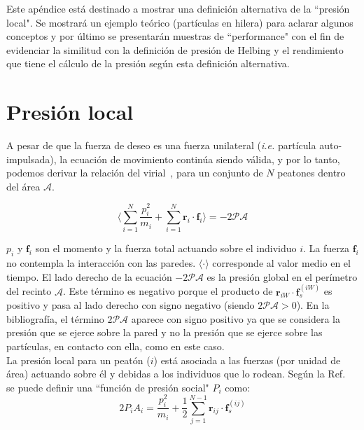 \label{appendix:presion}

Este apéndice está destinado a mostrar una definición alternativa de la ``presión local". Se mostrará un ejemplo teórico (partículas en hilera) para aclarar algunos conceptos y por último se presentarán muestras de ``performance" con el fin de evidenciar la similitud con la definición de presión de Helbing y el rendimiento que tiene el cálculo de la presión según esta definición alternativa.  
\\

\section{Presión local}

A pesar de que la fuerza de deseo es una fuerza unilateral (\textit{i.e.} partícula auto-impulsada), la ecuación de movimiento continúa siendo válida, y por lo tanto, podemos derivar la relación del virial~\cite{lion}, para un conjunto de $N$ peatones dentro del área $\mathcal{A}$.

\begin{equation}
 \bigg\langle\displaystyle\sum_{i=1}^N\displaystyle\frac{p_i^2}{m_i} + 
\displaystyle\sum_{i=1}^N 
\mathbf{r}_i\cdot\mathbf{f}_i\bigg\rangle=-2\mathcal{PA}\label{virial1}
\end{equation}


$p_i$  y $\mathbf{f}_i$ son el momento y la fuerza total actuando sobre el individuo $i$. La fuerza $\mathbf{f}_i$ no contempla la interacción con las paredes.  $\langle\cdot\rangle$ corresponde al valor medio en el tiempo. El lado derecho de la ecuación $-2\mathcal{PA}$ es la presión global en el perímetro del recinto $\mathcal{A}$. Este término es negativo porque el producto de $\mathbf{r}_{iW}\cdot\mathbf{f}_s^{(iW)}$ es positivo y pasa al lado derecho con signo negativo (siendo $2\mathcal{PA}>0$). En la bibliografía, el término $2\mathcal{PA}$ aparece con signo positivo ya que se considera la presión que se ejerce sobre la pared y no la presión que se ejerce sobre las partículas, en contacto con ella, como en este caso.  \\
La presión local para un peatón ($i$) está asociada a las fuerzas (por unidad de área) actuando sobre él y debidas a los individuos que lo rodean. Según la Ref.~\cite{lion} se puede definir una ``función de presión social" $P_i$ como:\\

\begin{equation}
2P_iA_i=\displaystyle\frac{p_i^2}{m_i} + \frac{1}{2}
\displaystyle\sum_{j=1}^{N-1}
\mathbf{r}_{ij}\cdot\mathbf{f}_s^{(ij)}\label{pa}
\end{equation}

